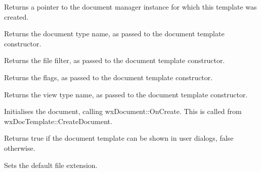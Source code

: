 Returns a pointer to the document manager instance for which this template was created.

\label{wxdoctemplategetdocumentname}


Returns the document type name, as passed to the document template constructor.

\label{wxdoctemplategetfilefilter}


Returns the file filter, as passed to the document template constructor.

\label{wxdoctemplategetflags}


Returns the flags, as passed to the document template constructor.

\label{wxdoctemplategetviewname}


Returns the view type name, as passed to the document template constructor.

\label{wxdoctemplateinitdocument}


Initialises the document, calling wxDocument::OnCreate. This is called from
wxDocTemplate::CreateDocument.

\label{wxdoctemplateisvisible}


Returns true if the document template can be shown in user dialogs, false otherwise.

\label{wxdoctemplatesetdefaultextension}


Sets the default file extension.

\label{wxdoctemplatesetdescription}


